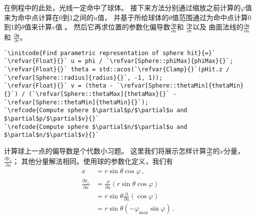 在例程中的此处，光线一定命中了球体。
接下来方法分别通过缩放之前计算的$\varphi$值来为命中点计算在0到1之间的$u$值，
并基于所给球体的$\theta$值范围通过为命中点计算0到1的$\theta$值来计算$v$值
。
然后它再求位置的参数化偏导数$\displaystyle\frac{\partial \bm p}{\partial u}$和
$\displaystyle\frac{\partial \bm p}{\partial v}$以及
曲面法线的$\displaystyle\frac{\partial \bm n}{\partial u}$和
$\displaystyle\frac{\partial \bm n}{\partial v}$。
\begin{lstlisting}
`\initcode{Find parametric representation of sphere hit}{=}`
`\refvar{Float}{}` u = phi / `\refvar[Sphere::phiMax]{phiMax}{}`;
`\refvar{Float}{}` theta = std::acos(`\refvar{Clamp}{}`(pHit.z / `\refvar[Sphere::radius]{radius}{}`, -1, 1));
`\refvar{Float}{}` v = (theta - `\refvar[Sphere::thetaMin]{thetaMin}{}`) / (`\refvar[Sphere::thetaMax]{thetaMax}{}` - `\refvar[Sphere::thetaMin]{thetaMin}{}`);
`\refcode{Compute sphere $\partial$p/$\partial$u and $\partial$p/$\partial$v}{}`
`\refcode{Compute sphere $\partial$n/$\partial$u and $\partial$n/$\partial$v}{}`
\end{lstlisting}

计算球上一点的偏导数是个代数小习题。
这里我们将展示怎样计算$\displaystyle\frac{\partial \bm p}{\partial u}$的$x$分量，
$\displaystyle\frac{\partial p_x}{\partial u}$；
其他分量解法相同。使用球的参数化定义，我们有
\begin{align*}
    x                               & =r\sin\theta\cos\varphi\, ,                          \\
    \frac{\partial p_x}{\partial u} & =\frac{\partial}{\partial u}(r\sin\theta\cos\varphi) \\
                                    & =r\sin\theta\frac{\partial}{\partial u}(\cos\varphi) \\
                                    & =r\sin\theta(-\varphi_{\max}\sin\varphi)\, .
\end{align*}